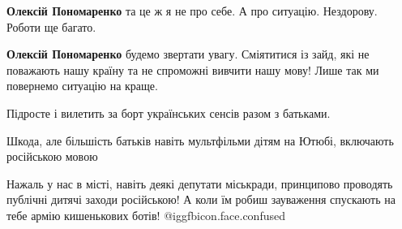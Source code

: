 \begin{itemize}
\begin{itemize} %
\textbf{Олексій Пономаренко} та це ж я не про себе. А про ситуацію. Нездорову. Роботи ще багато.

\textbf{Олексій Пономаренко} будемо звертати увагу.
Сміятитися із зайд, які не поважають нашу країну та не спроможні вивчити нашу мову!
Лише так ми повернемо ситуацію на краще.
\end{itemize} %

Підросте і вилетить за борт українських сенсів разом з батьками.

Шкода, але більшість батьків навіть мультфільми дітям на Ютюбі, включають російською мовою


Нажаль у нас в місті, навіть деякі депутати міськради, принципово проводять
публічні дитячі заходи російською! А коли їм робиш зауваження спускають на тебе
армію кишенькових ботів! @igg{fbicon.face.confused} 

\end{itemize} %

